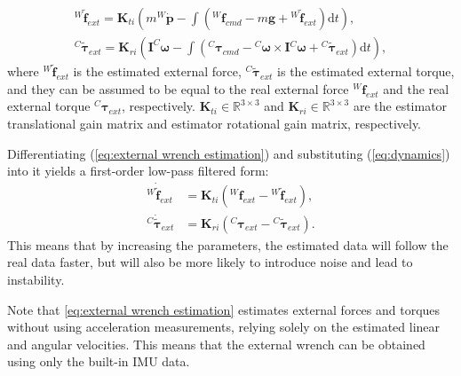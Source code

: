 \begin{subequations}
\label{eq:external wrench estimation}
\begin{align}
 {^W\!\boldsymbol{\tilde{f}}_{ext}}=\boldsymbol{K}_{ti}(m^W\!\dot{\boldsymbol{p}}-\int({^W\!\boldsymbol{f}_{cmd}}-m\boldsymbol{g}+ {^W\!\boldsymbol{\tilde{f}}_{ext}})\mathrm{d}t),\\
 {^C\!\boldsymbol{\tilde{\tau}}_{ext}}=\boldsymbol{K}_{ri}(\boldsymbol{I}^C\!\boldsymbol{\omega}-\int({^C\!\boldsymbol{\tau}_{cmd}}-{^C\!\boldsymbol{\omega}} \times \boldsymbol{I}{^C\!\boldsymbol{\omega}} + {^C\!\boldsymbol{\tilde{\tau}}_{ext}})\mathrm{d}t),
\end{align}
\end{subequations}
where ${^W\!\boldsymbol{\tilde{f}}_{ext}}$ is the estimated external force, ${^C\!\boldsymbol{\tilde{\tau}}_{ext}}$ is the estimated external torque, and they can be assumed to be equal to the real external force ${^W\!\boldsymbol{f}_{ext}}$ and the real external torque  ${^C\!\boldsymbol{\tau}_{ext}}$, respectively. $\boldsymbol{K}_{ti} \in \mathbb{R}^{3\times3} $ and $\boldsymbol{K}_{ri} \in \mathbb{R}^{3\times3}$ are the estimator translational gain matrix and estimator rotational gain matrix, respectively.

Differentiating (\ref{eq:external wrench estimation}) and substituting (\ref{eq:dynamics}) into it yields a first-order low-pass filtered form: 
\begin{subequations}
\label{eq:external wrench estimation low-pass}
\begin{align}
 {^W\!\boldsymbol{\dot{\tilde{f}}}_{ext}}&=\boldsymbol{K}_{ti}({^W\!\boldsymbol{f}}_{ext}-{^W\!\boldsymbol{\tilde{f}}_{ext}}),\\
 {^C\!\boldsymbol{\dot{\tilde{\tau}}}_{ext}}&=\boldsymbol{K}_{ri}({^C\!\boldsymbol{\tau}_{ext}}-{^C\!\boldsymbol{\tilde{\tau}}_{ext}}).
\end{align}
\end{subequations}
This means that by increasing the parameters, the estimated data will follow the real data faster, but will also be more likely to introduce noise and lead to instability.

Note that \eqref{eq:external wrench estimation} estimates external forces and torques without using acceleration measurements, relying solely on the estimated linear and angular velocities. This means that the external wrench can be obtained using only the built-in IMU data.

